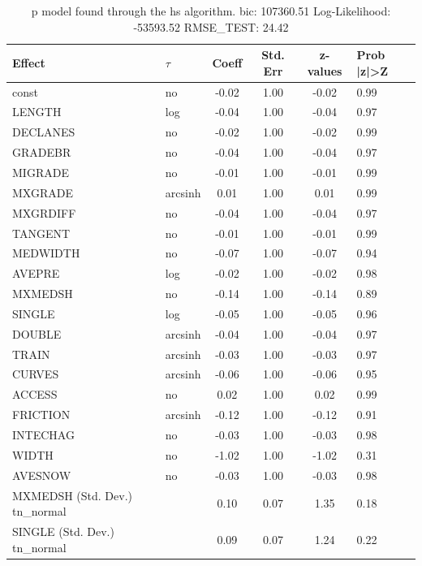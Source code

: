 \begin{table}
	\caption{p model found through the hs algorithm. bic: 107360.51 Log-Likelihood: -53593.52 RMSE_TEST: 24.42}
	\begin{center}
		\begin{tabular}{|l|l|c|c|c|l|}
			\hline
			Effect & $\tau$ & Coeff & Std. Err & z-values & Prob |z|>Z \\
			\hline
			const & no & -0.02 & 1.00 & -0.02 & 0.99 \\
			\hline
			LENGTH & log & -0.04 & 1.00 & -0.04 & 0.97 \\
			\hline
			DECLANES & no & -0.02 & 1.00 & -0.02 & 0.99 \\
			\hline
			GRADEBR & no & -0.04 & 1.00 & -0.04 & 0.97 \\
			\hline
			MIGRADE & no & -0.01 & 1.00 & -0.01 & 0.99 \\
			\hline
			MXGRADE & arcsinh & 0.01 & 1.00 & 0.01 & 0.99 \\
			\hline
			MXGRDIFF & no & -0.04 & 1.00 & -0.04 & 0.97 \\
			\hline
			TANGENT & no & -0.01 & 1.00 & -0.01 & 0.99 \\
			\hline
			MEDWIDTH & no & -0.07 & 1.00 & -0.07 & 0.94 \\
			\hline
			AVEPRE & log & -0.02 & 1.00 & -0.02 & 0.98 \\
			\hline
			MXMEDSH & no & -0.14 & 1.00 & -0.14 & 0.89 \\
			\hline
			SINGLE & log & -0.05 & 1.00 & -0.05 & 0.96 \\
			\hline
			DOUBLE & arcsinh & -0.04 & 1.00 & -0.04 & 0.97 \\
			\hline
			TRAIN & arcsinh & -0.03 & 1.00 & -0.03 & 0.97 \\
			\hline
			CURVES & arcsinh & -0.06 & 1.00 & -0.06 & 0.95 \\
			\hline
			ACCESS & no & 0.02 & 1.00 & 0.02 & 0.99 \\
			\hline
			FRICTION & arcsinh & -0.12 & 1.00 & -0.12 & 0.91 \\
			\hline
			INTECHAG & no & -0.03 & 1.00 & -0.03 & 0.98 \\
			\hline
			WIDTH & no & -1.02 & 1.00 & -1.02 & 0.31 \\
			\hline
			AVESNOW & no & -0.03 & 1.00 & -0.03 & 0.98 \\
			\hline
			MXMEDSH (Std. Dev.) tn_normal &  & 0.10 & 0.07 & 1.35 & 0.18 \\
			\hline
			SINGLE (Std. Dev.) tn_normal &  & 0.09 & 0.07 & 1.24 & 0.22 \\

\end{tabular}
\end{center}
\end{table}
